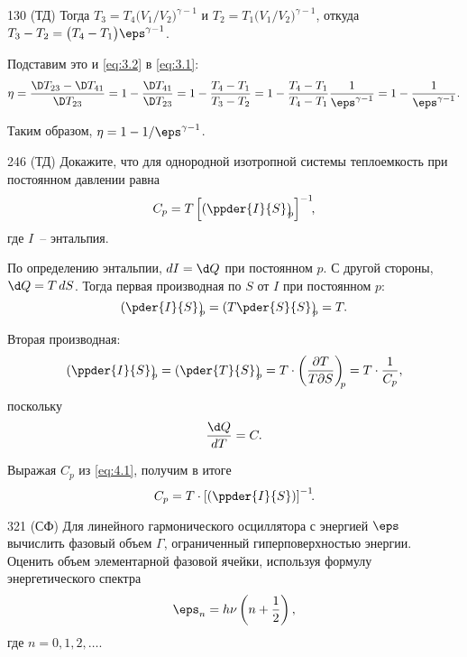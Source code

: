 \documentclass[pscyr]{hedwork}
\begin{document}
\begin{task}{130 (ТД)}
    Тогда \( T_3 = T_4 \bigl(V_1 / V_2\big)^{\gamma - 1} \) и
    \( T_2 = T_1 \bigl(V_1 / V_2\big)^{\gamma - 1} \), откуда
    \( T_3 - T_2 = \bigl(T_4 - T_1\big)\eps^{\gamma - 1} \).

    Подставим это и \eqref{eq:3.2} в \eqref{eq:3.1}:
    \[
      \eta = \frac{\D T_{23} - \D T_{41}}{\D T_{23}} =
        1 - \frac{\D T_{41}}{\D T_{23}} = 1 - \frac{T_4 - T_1}{T_3 - T_2} =
        1 - \frac{T_4 - T_1}{T_4 - T_1}\frac{1}{\eps^{\gamma - 1}} =
        1 - \frac{1}{\eps^{\gamma - 1}}.
    \]

    Таким образом, \( \eta = 1 - 1 / \eps^{\gamma - 1} \).

  \end{task}

  \begin{task}{246 (ТД)}{
    Докажите, что для однородной изотропной системы теплоемкость при постоянном
    давлении равна
    \[
      C_p = T\left[\left(\ppder{I}{S}\right)_{\!\!p}\right]^{-1}\!\!,
    \]
    где \( I \)~-- энтальпия.
  }

    По определению энтальпии, \( dI = \d Q \) при постоянном \( p \).
    С другой стороны, \( \d Q = T\,dS \). Тогда первая производная по
    \( S \) от \( I \) при постоянном \( p \):
    \[
      \left(\pder{I}{S}\right)_{\!\!p} = \left(T\pder{S}{S}\right)_{\!\!p} = T.
    \]

    Вторая производная:
    \begin{equation}
      \left(\ppder{I}{S}\right)_{\!\!p} = \left(\pder{T}{S}\right)_{\!\!p} =
        T \cdot \left(\frac{\partial T}{T\partial S}\right)_{\!\!p} =
        T \cdot \frac{1}{C_p},
      \label{eq:4.1}
    \end{equation}
    поскольку
    \[
      \frac{\d Q}{dT} = C.
    \]

    Выражая \( C_p \) из \eqref{eq:4.1}, получим в итоге
    \[
      C_p = T \cdot \left[\left(\ppder{I}{S}\right)\right]^{-1}\!\!.
    \]

  \end{task}

  \begin{task}{321 (СФ)}{
    Для линейного гармонического осциллятора с энергией \( \eps \) вычислить
    фазовый объем \( \Gamma \), ограниченный гиперповерхностью энергии. Оценить
    объем элементарной фазовой ячейки, используя формулу энергетического спектра
    \[
      \eps_n = h\nu \left(n + \frac{1}{2}\right),
    \]
    где \( n = 0, 1, 2, \ldots \).
  }

  \end{task}
\end{document}
